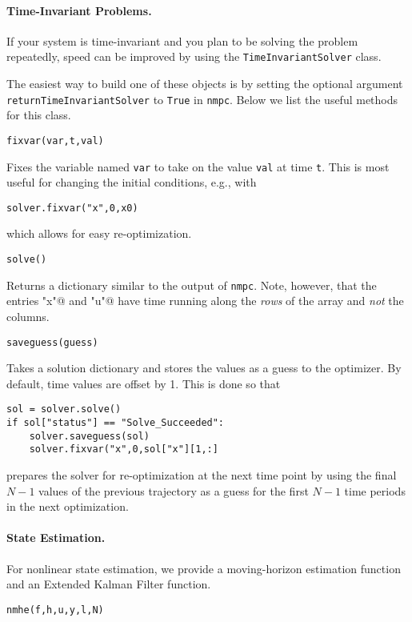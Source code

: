 \documentclass{article}
\newcommand{\funcname}[2][.25em]{\vspace{#1}\noindent\texttt{#2}\nopagebreak\vspace{#1}}
\begin{document}
\begin{multicols}{2}
\paragraph*{Time-Invariant Problems.}

If your system is time-invariant and you plan to be solving the problem repeatedly, speed can be improved by using the \texttt{TimeInvariantSolver} class.

The easiest way to build one of these objects is by setting the optional argument \texttt{returnTimeInvariantSolver} to \texttt{True} in \texttt{nmpc}.
Below we list the useful methods for this class.

\funcname{fixvar(var,t,val)}

Fixes the variable named \texttt{var} to take on the value \texttt{val} at time \texttt{t}.
This is most useful for changing the initial conditions, e.g., with
%
\begin{lstlisting}[frame=L]
solver.fixvar("x",0,x0)
\end{lstlisting}
%
which allows for easy re-optimization.

\funcname{solve()}

Returns a dictionary similar to the output of \texttt{nmpc}.
Note, however, that the entries \lstinline@"x"@ and \lstinline@"u"@ have time running along the \emph{rows} of the array and \emph{not} the columns.

\funcname{saveguess(guess)}

Takes a solution dictionary and stores the values as a guess to the optimizer.
By default, time values are offset by 1. This is done so that
%
\begin{lstlisting}[frame=L]
sol = solver.solve()
if sol["status"] == "Solve_Succeeded":
    solver.saveguess(sol)
    solver.fixvar("x",0,sol["x"][1,:]
\end{lstlisting}
%
prepares the solver for re-optimization at the next time point by using the final $N-1$ values of the previous trajectory as a guess for the first $N-1$ time periods in the next optimization.

\paragraph*{State Estimation.}

For nonlinear state estimation, we provide a moving-horizon estimation function and an Extended Kalman Filter function.

\funcname{nmhe(f,h,u,y,l,N)}


\end{multicols}
\end{document}
